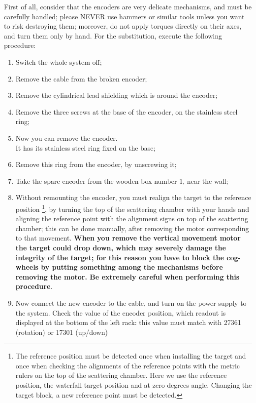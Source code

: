 
 First of all, consider that the encoders are very delicate mechanisms,
 and must be carefully handled; please NEVER use hammers or similar tools 
unless you want to risk destroying them; moreover, do not apply torques 
directly   on their  axes, and turn them only by hand.
For the substitution, execute the following procedure:
\begin{enumerate}
\item Switch the whole system off;
\item Remove the cable from the broken encoder;
\item Remove the cylindrical lead shielding which is around the encoder;
\item Remove the three screws at the base of the encoder, on the 
	stainless steel  ring;
\item Now you can remove the encoder. \\
 	It has its stainless steel ring fixed on the base;
\item Remove this ring from the encoder, by unscrewing it;
\item Take the spare encoder from the wooden box  number 1, near the wall;
\item Without remounting the encoder, you must realign the target to the 
	reference  position \footnote{The reference position must be detected 
	once when installing the target and once 
	when checking the alignments of 
	the reference points with the metric rulers on the top of the 
	scattering chamber. Here we use the reference position, 
	the waterfall target position and at zero degrees angle. Changing 
	the target block, a new reference point must be detected.}, by 
	turning the top of the scattering chamber with your hands  
	and aligning the reference point with the alignment signs on  
	top of the scattering chamber; this can be done manually, after  
	removing the motor corresponding to that movement.
	{\bf When you remove the vertical movement motor the 
	target could drop down, which may severely damage  the integrity 
	of the target; for this reason you have to block the cog-wheels 
	by putting something among the mechanisms before removing the motor. 
	Be extremely careful when performing this procedure}. 
\item Now connect the new encoder to the cable, and turn 
	on the power supply to 
	the system. Check the value of the encoder position, 
	which readout is displayed  at the bottom of the left rack:
 	this value must match with  27361 (rotation) or 17301 (up/down) 

\end{enumerate}
